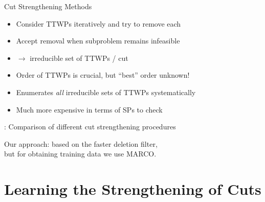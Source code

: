 \documentclass[aspectratio=1610]{beamer}
\newcommand{\important}[1]{{\color{green!60!black}#1}}
\begin{document}
\begin{frame}{Cut Strengthening Methods}

\begin{itemize}
	\item Consider TTWPs iteratively and try to remove each
	\item Accept removal when subproblem remains infeasible
	\item $\rightarrow $ \important{irreducible set of TTWPs / cut}
	\item Order of TTWPs is crucial, but ``best'' order unknown!
\end{itemize}

\bigskip
{}
\begin{itemize}
	\item Enumerates \important{\emph{all} irreducible sets of TTWPs} systematically
	\item Much more expensive in terms of SPs to check
\end{itemize}

\bigskip 
\citet{karlsson2021strengthening}: Comparison of different cut strengthening procedures

\bigskip
Our approach: based on the faster deletion filter,\\
but for obtaining training data we use MARCO.
\end{frame}


\section{Learning the Strengthening of Cuts}
\end{document}
